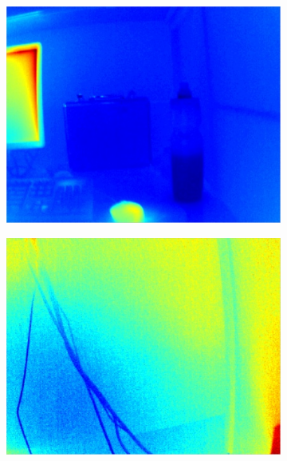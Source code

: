 \begin{figure}
\centering
	\begin{subfigure}{0.49\columnwidth}
    \centering
    \includegraphics[width=1.00\textwidth]{media/V_C_highsnr.jpg}
	    \caption{}
		\label{fig:imgprocessing_1}
  \end{subfigure}
	\begin{subfigure}{0.49\columnwidth}
    \centering
    \includegraphics[width=1.00\textwidth]{media/V_C_lowsnr.jpg}
		\caption{}
		\label{fig:imgprocessing_2}
  \end{subfigure} \vspace{10pt} \\ 

\end{figure}
